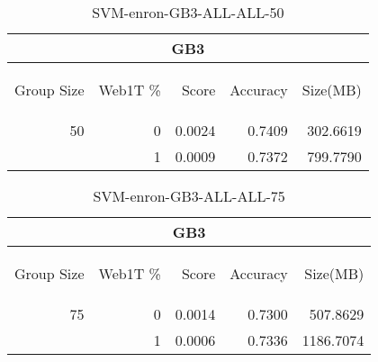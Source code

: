 \begin{center}
\begin{table}[htbp] 
 \begin{center}
\begin{tabular}{ | r | r | r | r | r |}
\hline
\multicolumn{5}{|c|}{GB3}\\
\hline
\begin{sideways}Group Size\end{sideways} & \begin{sideways}Web1T \%\end{sideways} & \begin{sideways}Score\end{sideways} & \begin{sideways}Accuracy\end{sideways} & \begin{sideways}Size(MB)\end{sideways}\\
\hline
\multirow{1}{*}{50}
 & 0 & 0.0024 & 0.7409 & 302.6619\\ \cline{2-5}
 & 1 & 0.0009 & 0.7372 & 799.7790\\ \cline{2-5}
\hline
\end{tabular}
\caption{SVM-enron-GB3-ALL-ALL-50}
\label{table:SVM-enron-GB3-ALL-ALL-50}
\end{center}
 \end{table}
\end{center}

\begin{center}
\begin{table}[htbp] 
 \begin{center}
\begin{tabular}{ | r | r | r | r | r |}
\hline
\multicolumn{5}{|c|}{GB3}\\
\hline
\begin{sideways}Group Size\end{sideways} & \begin{sideways}Web1T \%\end{sideways} & \begin{sideways}Score\end{sideways} & \begin{sideways}Accuracy\end{sideways} & \begin{sideways}Size(MB)\end{sideways}\\
\hline
\multirow{1}{*}{75}
 & 0 & 0.0014 & 0.7300 & 507.8629\\ \cline{2-5}
 & 1 & 0.0006 & 0.7336 & 1186.7074\\ \cline{2-5}
\hline
\end{tabular}
\caption{SVM-enron-GB3-ALL-ALL-75}
\label{table:SVM-enron-GB3-ALL-ALL-75}
\end{center}
 \end{table}
\end{center}

